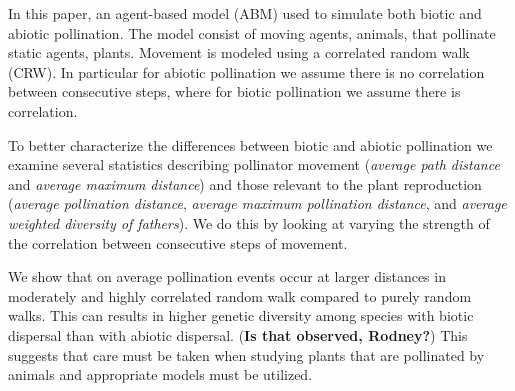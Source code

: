 In this paper, an agent-based model (ABM) used to simulate both biotic and abiotic pollination.  The model consist of moving agents, animals, that pollinate static agents, plants.  Movement is modeled using a correlated
random walk (CRW).  In particular for abiotic pollination we assume there is no correlation between consecutive steps, where for biotic pollination we assume there is correlation.

To better characterize the differences between biotic and abiotic pollination we examine several statistics describing pollinator movement
(\emph{average path distance} and \emph{average maximum distance}) and those relevant
to the plant reproduction (\emph{average pollination distance}, \emph{average maximum
pollination distance}, and \emph{average weighted diversity of fathers}).  We do this by looking at varying the strength of the correlation between consecutive steps of movement.

We show that on average pollination events occur at larger distances in moderately and highly correlated random walk compared to purely random walks.  This can results in higher genetic diversity among species with biotic dispersal than with abiotic dispersal. ({\bf Is that observed, Rodney?}) This suggests that care must be taken when studying plants that are pollinated by animals and appropriate models must be utilized. 